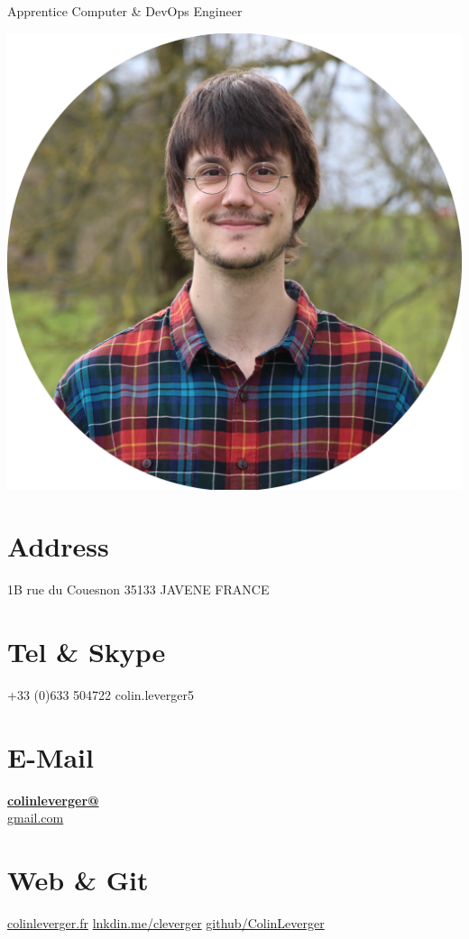 \documentclass[]{friggeri-cv}
\begin{document}
      {Apprentice Computer \& DevOps Engineer}


\begin{aside}
  \includegraphics[scale=0.145]{img/rounded.png}
  \section{Address}
    1B rue du Couesnon
    35133 JAVENE
    FRANCE
    ~
  \section{Tel \& Skype}
    +33 (0)633 504722
    colin.leverger5
    ~
  \section{E-Mail}
    \href{mailto:colinleverger@gmail.com}{\textbf{colinleverger@}\\gmail.com}
    ~
  \section{Web \& Git}
    \href{http://www.colinleverger.fr}{colinleverger.fr}
    \href{https://www.linkedin.com/in/colinleverger}{lnkdin.me/cleverger}
    \href{https://github.com/ColinLeverger}{github/ColinLeverger}
    ~

\end{aside}
\end{document}
